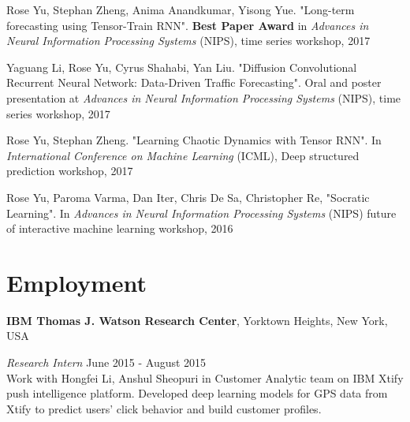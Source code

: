 \documentclass[margin,line]{res}
\begin{document}
\begin{resume}
\begin{enumerate}[label={[W\arabic*]}]
\item Rose Yu, Stephan Zheng, Anima Anandkumar, Yisong Yue. "Long-term forecasting using Tensor-Train RNN". \textbf{Best Paper Award}  in \textit{Advances in Neural Information Processing Systems} (NIPS), time series workshop, 2017


\item Yaguang Li, Rose Yu, Cyrus Shahabi, Yan Liu. "Diffusion Convolutional Recurrent Neural Network: Data-Driven Traffic Forecasting". Oral and poster presentation at \textit{Advances in Neural Information Processing Systems} (NIPS), time series workshop, 2017


\item Rose Yu, Stephan Zheng. "Learning Chaotic Dynamics with Tensor RNN". In  \textit{International Conference on Machine Learning} (ICML), Deep structured prediction workshop, 2017

\item Rose Yu,  Paroma Varma, Dan Iter, Chris De Sa, Christopher Re,  "Socratic Learning".  In \textit{Advances in Neural Information Processing Systems}  (NIPS) future of interactive machine learning workshop, 2016

%
%
%

\end{enumerate}


\section{\sc Employment} 
{\bf  IBM Thomas J. Watson Research Center}, Yorktown Heights, New York, USA

\vspace{-.3cm}
{\em Research Intern} \hfill {June 2015 - August 2015}\\ %
Work with Hongfei Li, Anshul Sheopuri in Customer Analytic team on IBM Xtify push intelligence platform. Developed deep learning models for GPS data from Xtify to predict users' click behavior and build customer profiles. 



\end{resume}
\end{document}
